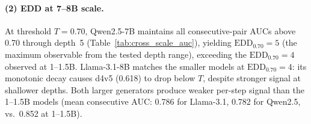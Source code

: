\paragraph{(2) EDD at 7--8B scale.}
At threshold $T{=}0.70$, Qwen2.5-7B maintains all consecutive-pair AUCs above 0.70 through depth~5 (Table~\ref{tab:cross_scale_auc}), yielding $\mathrm{EDD}_{0.70} = 5$ (the maximum observable from the tested depth range), exceeding the $\mathrm{EDD}_{0.70}{=}4$ observed at 1--1.5B.
Llama-3.1-8B matches the smaller models at $\mathrm{EDD}_{0.70}{=}4$: its monotonic decay causes d4v5 (0.618) to drop below $T$, despite stronger signal at shallower depths.
Both larger generators produce weaker per-step signal than the 1--1.5B models (mean consecutive AUC: 0.786 for Llama-3.1, 0.782 for Qwen2.5, vs.\ 0.852 at 1--1.5B).

\begin{table}[h]
\centering
\small
\caption{Consecutive binary AUC. Llama-3.1-8B exhibits monotonic decay; Qwen2.5-7B shows a U-shaped pattern; Qwen2.5-14B$^\dagger$ (depths 0--3 only) has d0v1 below $T{=}0.70$ in all strategies, yielding $\mathrm{EDD}_{0.70}{=}0$ despite some later pairs exceeding the threshold. $^\dagger$Self-reference model.}
\label{tab:cross_scale_auc}
\end{table}

